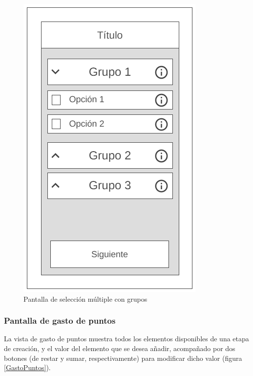 \begin{figure}[H]
    \centering
    \includegraphics[scale=0.4]{Figures/Mockups/Mock_SeleccionMultipleGrupos.png}
    \caption{Pantalla de selección múltiple con grupos}
    \label{SeleccionMultipleGrupos}    
\end{figure}
\newpage
\subsubsection{Pantalla de gasto de puntos}
La vista de gasto de puntos muestra todos los elementos disponibles de una etapa de creación, y el valor del elemento 
que se desea añadir, acompañado por dos botones (de restar y sumar, respectivamente) para modificar dicho valor 
(figura \ref*{GastoPuntos}).

